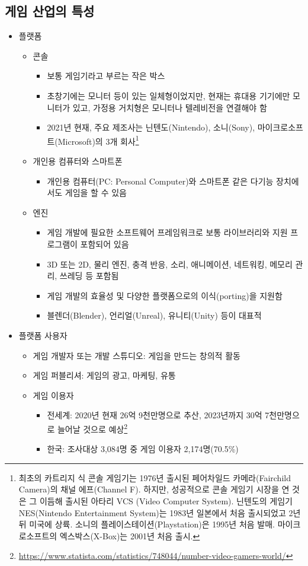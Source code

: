 \subsection{게임 산업의 특성}
\begin{itemize}
\item 플랫폼
	\begin{itemize}
	\item 콘솔  \citep{Lee:2012ud}
		\begin{itemize}
		\item 보통 게임기라고 부르는 작은 박스
		\item 초창기에는 모니터 등이 있는 일체형이었지만, 현재는 휴대용 기기에만 모니터가 있고, 가정용 거치형은 모니터나 텔레비전을 연결해야 함
		\item 2021년 현재, 주요 제조사는 닌텐도(Nintendo), 소니(Sony), 마이크로소프트(Microsoft)의 3개 회사\footnote{최초의 카트리지 식 콘솔 게임기는 1976년 출시된 페어차일드 카메라(Fairchild Camera)의 채널 에프(Channel F). 하지만, 성공적으로 콘솔 게임기 시장을 연 것은 그 이듬해 출시된 아타리 VCS (Video Computer System). 닌텐도의 게임기 NES(Nintendo Entertainment System)는 1983년 일본에서 처음 출시되었고 2년 뒤 미국에 상륙. 소니의 플레이스테이션(Playstation)은 1995년 처음 발매. 마이크로소프트의 엑스박스(X-Box)는 2001년 처음 출시.}
		\end{itemize}
	\item 개인용 컴퓨터와 스마트폰
		\begin{itemize}
		\item 개인용 컴퓨터(PC: Personal Computer)와 스마트폰 같은 다기능 장치에서도 게임을 할 수 있음
		\end{itemize}
	\item 엔진
		\begin{itemize}
		\item 게임 개발에 필요한 소프트웨어 프레임워크로 보통 라이브러리와 지원 프로그램이 포함되어 있음
		\item 3D 또는  2D, 물리 엔진, 충격 반응, 소리, 애니메이션, 네트워킹, 메모리 관리, 쓰레딩 등 포함됨
		\item 게임 개발의 효율성 및 다양한 플랫폼으로의 이식(porting)을 지원함
		\item 블렌더(Blender), 언리얼(Unreal), 유니티(Unity) 등이 대표적
		\end{itemize}
	\end{itemize}
\item 플랫폼 사용자
	\begin{itemize}
	\item 게임 개발자 또는 개발 스튜디오: 게임을 만드는 창의적 활동
	\item 게임 퍼블리셔: 게임의 광고, 마케팅, 유통
	\item 게임 이용자
		\begin{itemize}
		\item	전세계: 2020년 현재 26억 9천만명으로 추산, 2023년까지 30억 7천만명으로 늘어날 것으로 예상\footnote{\url{https://www.statista.com/statistics/748044/number-video-gamers-world/}}
		\item 한국: 조사대상 3,084명 중 게임 이용자 2,174명(70.5\%) \citep{hangugkontencheujinheung-won:2020aa}
		\end{itemize}
	\end{itemize}
	

\end{itemize}
